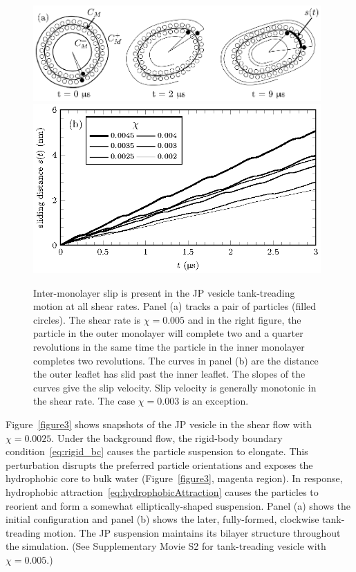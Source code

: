 \documentclass[lineno]{jfm}
\begin{document}
\begin{figure}
\begin{center}
  \includegraphics[width=11cm]{fig4a.eps}\\
  \includegraphics[width=11cm]{fig4b.eps}
\end{center} 
\caption{\label{figure5} Inter-monolayer slip is present in the JP
  vesicle tank-treading motion at all shear rates. Panel (a) tracks a
  pair of particles (filled circles). The shear rate is $\chi=0.005$
  and in the right figure, the particle in the outer monolayer will complete two and a
  quarter revolutions in the same time the particle in the inner monolayer completes two
  revolutions. The curves in panel (b) are the distance the outer
  leaflet has slid past the inner leaflet. The slopes of the curves
  give the slip velocity. 
  Slip velocity is generally monotonic in the shear rate.
  The case $\chi = 0.003$ is an exception.}
\end{figure}

Figure~\ref{figure3} shows snapshots of the JP vesicle in the shear flow
with $\chi=0.0025$. Under the background flow, the rigid-body boundary
condition~\eqref{eq:rigid_bc} causes the particle suspension to
elongate. This perturbation disrupts the preferred particle orientations
and exposes the hydrophobic core to bulk water (Figure~\ref{figure3},
magenta region). In response, hydrophobic
attraction~\eqref{eq:hydrophobicAttraction} causes the particles to
reorient and form a somewhat elliptically-shaped suspension. Panel (a)
shows the initial configuration and panel (b) shows the later,
fully-formed, clockwise tank-treading motion. The JP suspension
maintains its bilayer structure throughout the simulation. 
(See Supplementary Movie S2 for tank-treading vesicle with $\chi=0.005$.)
%
\end{document}
